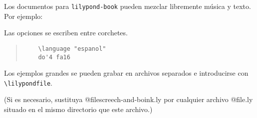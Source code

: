 \documentclass[letter]{book}
\begin{document}
Los documentos para \verb+lilypond-book+ pueden mezclar libremente
música y texto. Por ejemplo:

{%
\parindent 0pt
\noindent
\ifx\preLilyPondExample \undefined
\else
  \expandafter\preLilyPondExample
\fi
\def\lilypondbook{}%

\ifx\postLilyPondExample \undefined
\else
  \expandafter\postLilyPondExample
\fi
}

Las opciones se escriben entre corchetes.

\begin{quote}
\noindent
\begin{verbatim}
    \language "espanol"
    do'4 fa16
\end{verbatim}
{%
\parindent 0pt
\noindent
\ifx\preLilyPondExample \undefined
\else
  \expandafter\preLilyPondExample
\fi
\def\lilypondbook{}%

\ifx\postLilyPondExample \undefined
\else
  \expandafter\postLilyPondExample
\fi
}
\end{quote}

Los ejemplos grandes se pueden grabar en archivos separados e
introducirse con \verb+\lilypondfile+.

\begin{quote}
{%
\parindent 0pt
\noindent
\ifx\preLilyPondExample \undefined
\else
  \expandafter\preLilyPondExample
\fi
\def\lilypondbook{}%

\ifx\postLilyPondExample \undefined
\else
  \expandafter\postLilyPondExample
\fi
}
\end{quote}

(Si es necesario, sustituya @file{screech-and-boink.ly}
por cualquier archivo @file{.ly}
situado en el mismo directorio que este archivo.)
\end{document}
